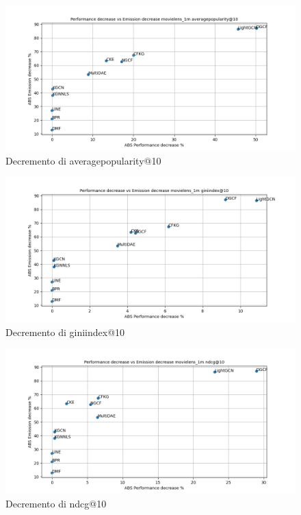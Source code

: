 \begin{figure}[H]
    \centering
    \includegraphics[scale=0.5]{images/decrement_averagepopularity@10_movielens_1m_30_6.png}
    \caption{Decremento di averagepopularity@10}
\end{figure}

\begin{figure}[H]
    \centering
    \includegraphics[scale=0.5]{images/decrement_giniindex@10_movielens_1m_30_6.png}
    \caption{Decremento di giniindex@10}
\end{figure}

\begin{figure}[H]
    \centering
    \includegraphics[scale=0.5]{images/decrement_ndcg@10_movielens_1m_30_6.png}
    \caption{Decremento di ndcg@10}
\end{figure}

